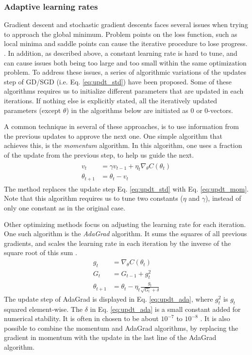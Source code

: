 \subsubsection{Adaptive learning rates}
Gradient descent and stochastic gradient descents faces several issues when trying to approach the global minimum.
Problem points on the loss function, such as local minima and saddle points can cause the iterative procedure to lose progress. \citep[p. 116-117]{Ketkar2017}.
In addition, as described above, a constant learning rate is hard to tune, and can cause issues both being too large and too small within the same optimization problem.
To address these issues, a series of algorithmic variations of the updates step of GD/SGD (i.e. Eq. \ref{eq:updt_std}) have been proposed.
Some of these algorithms requires us to initialize different parameters that are updated in each iterations.
If nothing else is explicitly stated, all the iteratively updated parameters (except $\theta$) in the algorithms below are initiated as 0 or 0-vectors.

A common technique in several of these approaches, is to use information from the previous updates to approve the next one.
One simple algorithm that achieves this, is the \textit{momentum} algorithm.
In this algorithm, one uses a fraction of the update from the previous step, to help us guide the next.
\begin{align}\label{eq:updt_mom}
\begin{split}
    v_t &= \gamma v_{t-1} + \eta_t \nabla_{\theta}C(\theta_t) \\
    \theta_{t+1} &= \theta_t - v_t
\end{split}
\end{align}
The method replaces the update step Eq. \ref{eq:updt_std} with Eq. \ref{eq:updt_mom}.
Note that this algorithm requires us to tune two constants ($\eta$ and $\gamma$), instead of only one constant as in the original case.

Other optimizing methods focus on adjusting the learning rate for each iteration. One such algorithm is the \textit{AdaGrad} algorithm.
It sums the squares of all previous gradients, and scales the learning rate in each iteration by the inverse of the square root of this sum \citep[p. 303]{Goodfellow-et-al-2016}.
\begin{equation}\label{eq:updt_ada}
\begin{split}
    g_t &= \nabla_{\theta}C(\theta_t)   \\
    G_t &= G_{t-1} + {g}_t^2          \\
    \theta_{t+1} &= \theta_t - \eta_t \frac{g_t}{\sqrt{G_t} + \delta}
\end{split}
\end{equation}
The update step of AdaGrad is displayed in Eq. \ref{eq:updt_ada}, where $g_t^2$ is $g_t$ squared element-wise.
The $\delta$ in Eq. \ref{eq:updt_ada} is a small constant added for numerical stability.
It is often in chosen to be about $10^{-7}$ to $10^{-8}$ \citep[p. 304]{Goodfellow-et-al-2016}.
It is also possible to combine the momentum and AdaGrad algorithms, by replacing the gradient in momentum with the update in the last line of the AdaGrad algorithm.

